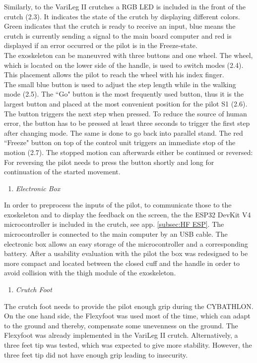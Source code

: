 \documentclass[conference,a4paper]{IEEEtran}
\begin{document}
Similarly, to the VariLeg II crutches a RGB LED is included in the front of the crutch (2.3). It indicates the state of the crutch by displaying different colors. Green indicates that the crutch is ready to receive an input, blue means the crutch is currently sending a signal to the main board computer and red is displayed if an error occurred or the pilot is in the Freeze-state.\\
The exoskeleton can be maneuvred with three buttons and one wheel. The wheel, which is located on the lower side of the handle, is used to switch modes (2.4). This placement allows the pilot to reach the wheel with his index finger. \\
The small blue button is used to adjust the step length while in the walking mode (2.5). The “Go" button is the most frequently used button, thus it is the largest button and placed at the most convenient position for the pilot S1 (2.6). The button triggers the next step when pressed. To reduce the source of human error, the button has to be pressed at least three seconds to trigger the first step after changing mode. The same is done to go back into parallel stand. The red “Freeze" button on top of the control unit triggers an immediate stop of the motion (2.7). The stopped motion can afterwards either be continued or reversed: For reversing the pilot needs to press the button shortly and long for continuation of the started movement. \\

\begin{enumerate}[\textit{(3)}]
    \item{\textit{Electronic Box}}
\end{enumerate}
In order to preprocess the inputs of the pilot, to communicate those to the exoskeleton and to display the feedback on the screen, the the ESP32 DevKit V4 microcontroller is included in the crutch, see app. \ref{subsec:HF ESP}. The microcontroller is connected to the main computer by an USB cable. The electronic box allows an easy storage of the microcontroller and a corresponding battery. After a usability evaluation with the pilot the box was redesigned to be more compact and located between the closed cuff and the handle in order to avoid collision with the thigh module of the exoskeleton.\\

\begin{enumerate}[\textit{(4)}]
    \item{\textit{Crutch Foot}}
\end{enumerate}
The crutch foot needs to provide the pilot enough grip during the CYBATHLON. On the one hand side, the Flexyfoot was used most of the time, which can adapt to the ground and thereby, compensate some unevenness on the ground. The Flexyfoot was already implemented in the VariLeg II crutch. Alternatively, a three feet tip was tested, which was expected to give more stability. However, the three feet tip did not have enough grip leading to insecurity. 
\end{document}
